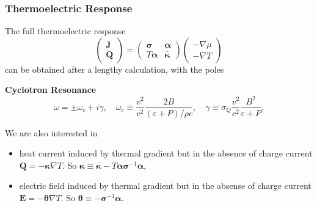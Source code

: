 \documentclass[10pt,aspectratio=43,xcolor=x11names,t]{beamer}%
\begin{document}
		\begin{frame}\frametitle{Thermoelectric Response}
			The full thermoelectric response			
			\begin{equation*}
				\left(\begin{array}{c}
					\bm{J}\\\bm{Q}
				\end{array}\right)=\left(\begin{array}{cc}
					\bm{\sigma}&\bm{\alpha}\\T\bm{\alpha}&\bm{\bar{\kappa}}
				\end{array}\right) \left(\begin{array}{c}
					-\nabla\mu\\-\nabla T
				\end{array}\right) 
			\end{equation*}
			can be obtained after a lengthy calculation, with the poles
			\begin{block}{\textbf{Cyclotron Resonance}}
				\begin{equation*}
					\omega=\pm\omega_c+i\gamma,\quad \omega_c\equiv\dfrac{v^2}{c^2}\dfrac{2B}{(\varepsilon+P)/\rho c},\quad \gamma\equiv\sigma_Q\dfrac{v^2}{c^2}\dfrac{B^2}{\varepsilon+P}.
				\end{equation*}
			\end{block}
			\pause
			We are also interested in 
			\begin{itemize}
				\item heat current induced by thermal gradient but in the absence of charge current $\bm{Q}=-\bm{\kappa}\nabla T$. So $\bm{\kappa}\equiv\bm{\bar{\kappa}}-T\bm{\alpha}\bm{\sigma}^{-1}\bm{\alpha}$,
				\item electric field induced by thermal gradient but in the absense of charge current $\bm{E}=-\bm{\theta}\nabla T$. So $\bm{\theta}\equiv-\bm{\sigma}^{-1}\bm{\alpha}$.
			\end{itemize}
		\end{frame}
\end{document}
